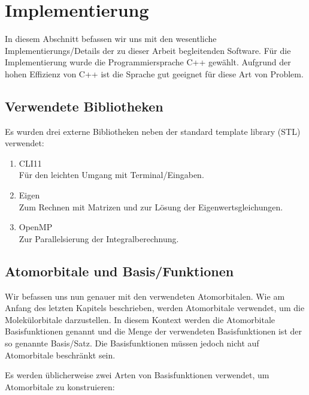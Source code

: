 \section{Implementierung}\label{implementation-section}
In diesem Abschnitt befassen wir uns mit den wesentliche Implementierungs\-/Details
der zu dieser Arbeit begleitenden Software. Für die Implementierung wurde
die Programmiersprache C++ gewählt. Aufgrund der hohen Effizienz von C++ ist die Sprache
gut geeignet für diese Art von Problem.

\subsection{Verwendete Bibliotheken}
Es wurden drei externe Bibliotheken neben der standard template library (STL) verwendet:
\begin{enumerate}
    \item CLI11 \cite{cl11}\\
    Für den leichten Umgang mit Terminal\-/Eingaben.
    \item Eigen \cite{eigen}\\
    Zum Rechnen mit Matrizen und zur Lösung der Eigenwertsgleichungen.
    \item OpenMP \cite{omp}\\
    Zur Parallelsierung der Integralberechnung.
\end{enumerate}

\subsection{Atomorbitale und Basis\-/Funktionen}\label{basis-functions-section}
Wir befassen uns nun genauer mit den verwendeten Atomorbitalen.
Wie am Anfang des letzten Kapitels beschrieben, werden Atomorbitale verwendet,
um die Molekülorbitale darzustellen. In diesem Kontext werden die Atomorbitale
Basisfunktionen genannt und die Menge der verwendeten Basisfunktionen
ist der so genannte Basis\-/Satz.
Die Basisfunktionen müssen jedoch nicht auf Atomorbitale beschränkt sein.
\cite[Ab. 5.3.1]{lewars_2016}

Es werden üblicherweise zwei Arten von Basisfunktionen verwendet,
um Atomorbitale zu konstruieren:

